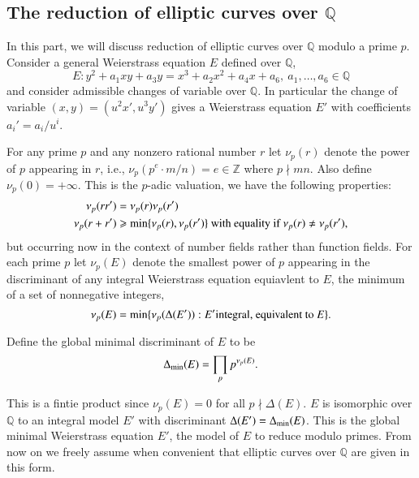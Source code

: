 \subsection{The reduction of elliptic curves over $\mathbb{Q}$}
In this part, we will discuss reduction of elliptic curves over $\mathbb{Q}$ modulo a prime $p$. Consider a general Weierstrass
equation $E$ defined over $\mathbb{Q}$, 
\begin{equation*}
    E: y^2+a_1 xy+a_3y=x^3+a_2x^2+a_4x+a_6, \ a_1,\ldots,a_6\in \mathbb{Q}
\end{equation*}
and consider admissible changes of variable over $\mathbb{Q}$. In particular the change of variable
$(x,y)=(u^2x',u^3y')$ gives a Weierstrass equation $E'$ with coefficients $a_i'=a_i/u^i$. \par
For any prime $p$ and any nonzero rational number $r$ let $\nu_p(r)$ denote the power of $p$ appearing in $r$,
i.e., $\nu _p(p^e\cdot m/n)=e\in \mathbb{Z}$ where $p\nmid mn$. Also define $\nu_p(0)=+\infty$. This is the $p$-adic
valuation, we have the following properties:
\begin{align*}
    \nu_p(rr') &=\nu_p(r)\nu_p(r') \\
    \nu_p(r+r')  &\geqslant {\rm min}\{\nu_p(r),\nu_p(r')\} \text{ with equality if $\nu_p(r)\neq\nu_p(r')$},
\end{align*}
but occurring now in the context of number fields rather than function fields. For each prime $p$ let $\nu_p(E)$
denote the smallest power of $p$ appearing in the discriminant of any integral Weierstrass equation equiavlent to 
$E$, the minimum of a set of nonnegative integers,
\begin{equation*}
    \nu_p(E)={\rm min}\{\nu_p(\Delta(E')):E' \text{integral, equivalent to $E$}\}.
\end{equation*}
\begin{definition}
    Define the global minimal discriminant of $E$ to be 
    \begin{equation*}
        \Delta_{\rm min}(E)= \prod _p p^{\nu_p(E)}.
    \end{equation*}
\end{definition}
This is a fintie product since $\nu_p(E)=0$ for all $p\nmid \Delta(E)$. $E$ is isomorphic over $\mathbb{Q}$
to an integral model $E'$ with discriminant $\Delta(E')=\Delta_{\rm min}(E)$. This is the global minimal 
Weierstrass equation $E'$, the model of $E$ to reduce modulo primes. From now on we freely assume when 
convenient that elliptic curves over $\mathbb{Q}$ are given in this form.\par
